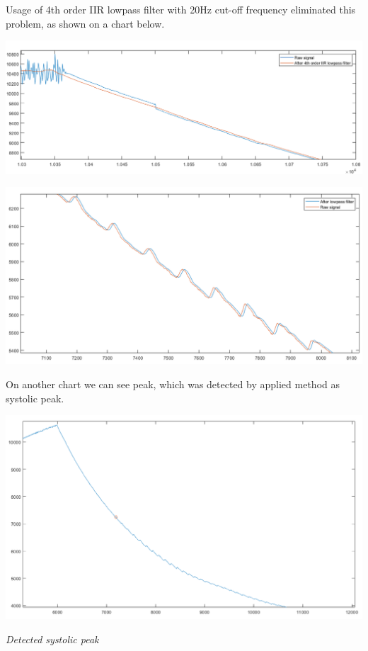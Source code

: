 Usage of 4th order I\+IR lowpass filter with 20Hz cut-\/off frequency eliminated this problem, as shown on a chart below. 
\begin{DoxyImage}
\includegraphics[width=\textwidth,height=\textheight/2,keepaspectratio=true]{SYSmeasumrementfiltration.png}
\end{DoxyImage}
 
\begin{DoxyImage}
\includegraphics[width=\textwidth,height=\textheight/2,keepaspectratio=true]{lowpassFiltered.png}
\end{DoxyImage}


On another chart we can see peak, which was detected by applied method as systolic peak. 
\begin{DoxyImage}
\includegraphics[width=\textwidth,height=\textheight/2,keepaspectratio=true]{detectedPeak.png}
\end{DoxyImage}
 {\itshape  Detected systolic peak }~\newline


